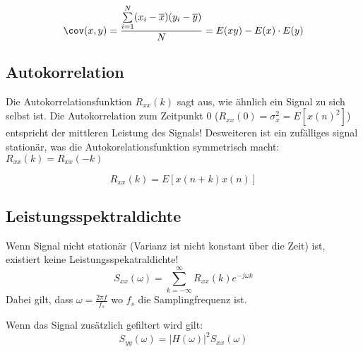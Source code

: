 \[
\cov(x,y) = \frac{\sum\limits_{i=1}^{N}(x_i - \overline{x})(y_i - \overline{y})}{N} = E(xy) - E(x)\cdot E(y)
\]

\subsection{Autokorrelation}
Die Autokorrelationsfunktion $R_{xx}(k)$ sagt aus, wie ähnlich ein Signal zu sich selbst ist. Die Autokorrelation zum Zeitpunkt 0 ($R_{xx}(0) = \sigma^2_x = E[x(n)^2]$) entspricht der mittleren Leistung des Signals! Desweiteren ist ein zufälliges signal stationär, was die Autokorelationsfunktion symmetrisch macht: $R_{xx}(k) = R_{xx}(-k)$

\[
R_{xx}(k) = E[x(n+k)x(n)]
\]

\subsection{Leistungsspektraldichte}
Wenn Signal nicht stationär (Varianz ist nicht konstant über die Zeit) ist, existiert keine Leistungsspekatraldichte!
\[
S_{xx}(\omega) = \sum_{k=-\infty}^{\infty}R_{xx}(k)e^{-j\omega k}
\]
Dabei gilt, dass $\omega = \frac{2\pi f}{f_s}$ wo $f_s$ die Samplingfrequenz ist.

Wenn das Signal zusätzlich gefiltert wird gilt:
\[
S_{yy}(\omega) = \left|H(\omega)\right|^2 S_{xx}(\omega)
\]